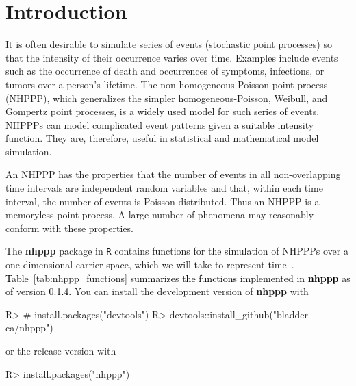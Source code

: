 \documentclass[10pt,letterpaper]{article}
\newcommand{\pkg}[1]{{\bf #1}}
\newcommand{\proglang}[1]{\texttt{#1}}
\newcommand{\red}[1]{\textcolor{black}{#1}}
\begin{document}
\newpage
\linenumbers
\section{Introduction} \label{sec:intro}

It is often desirable to simulate series of events (stochastic point processes) so that the intensity of their occurrence varies over time. Examples include events such as the occurrence of death and occurrences of symptoms, infections, or tumors over a person's lifetime. The non-homogeneous Poisson point process (NHPPP), which generalizes the simpler homogeneous-Poisson, Weibull, and Gompertz point processes, is a widely used model for such series of events. NHPPPs can model complicated event patterns given a suitable intensity function. They are, therefore, useful in statistical and mathematical model simulation.

An NHPPP has the properties that the number of events in all non-overlapping time intervals are independent random variables and that, within each time interval, the number of events is Poisson distributed. Thus an NHPPP is a memoryless point process. A large number of phenomena may reasonably conform with these properties.%

The \pkg{nhppp} package in \proglang{R} contains functions for the simulation of NHPPPs over a one-dimensional carrier space, which we will take to represent time~\cite{nhppp-package, trikalinos2024nhppp}. \red{Table~\ref{tab:nhppp_functions} summarizes the functions implemented in \pkg{nhppp} as of version 0.1.4.} You can install the development version of \pkg{nhppp} with
\begin{Schunk}
\begin{Sinput}
R> # install.packages("devtools")
R> devtools::install_github("bladder-ca/nhppp")
\end{Sinput}
\end{Schunk}
or the release version with
\begin{Schunk}
\begin{Sinput}
R> install.packages("nhppp")
\end{Sinput}
\end{Schunk}

\end{document}
